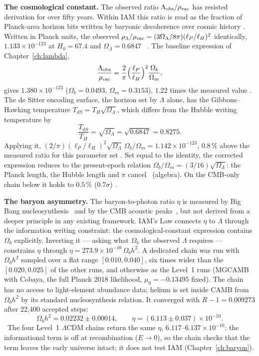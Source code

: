 \textbf{The cosmological constant.} The observed ratio $\Lambda_{\rm obs}/\rho_{\rm vac}$ has resisted derivation for over fifty years. Within IAM this ratio
is read as the fraction of Planck-area horizon bits written by baryonic decoherence over cosmic history \conjecture. Written in Planck units, the observed
$\rho_\Lambda/\rho_{\rm vac}=(3\Omega_\Lambda/8\pi)(\ell_P/\ell_H)^2$ identically, $1.133\times10^{-123}$ at $H_0=67.4$ and $\Omega_\Lambda=0.6847$~\cite{Planck2018VI} \calc. The
baseline expression of Chapter~\ref{ch:lambda},
\begin{equation}
\frac{\Lambda_{\rm obs}}{\rho_{\rm vac}}=\frac2\pi\Big(\frac{\ell_P}{\ell_H}\Big)^2\frac{\Omega_b}{\Omega_m}, \label{eq:law_ccbase}
\end{equation}
gives $1.380\times10^{-123}$ ($\Omega_b=0.0493$, $\Omega_m=0.3153$), $1.22$ times the measured value \calc. The de Sitter encoding surface, the horizon set by
$\Lambda$ alone, has the Gibbons--Hawking temperature $T_{dS}=T_H\sqrt{\Omega_\Lambda}$, which differs from the Hubble writing temperature by
\begin{equation}
\frac{T_{dS}}{T_H}=\sqrt{\Omega_\Lambda}=\sqrt{0.6847}=0.8275 . \label{eq:law_TdS}
\end{equation}
Applying it, $(2/\pi)(\ell_P/\ell_H)^2\sqrt{\Omega_\Lambda}\,\Omega_b/\Omega_m=1.142\times10^{-123}$, $0.8\,\%$ above the measured ratio for this parameter set
\calc. Set equal to the identity, the corrected expression reduces to the present-epoch relation $\Omega_b/\Omega_m=(3/16)\sqrt{\Omega_\Lambda}$: the
Planck length, the Hubble length and $\pi$ cancel \derived\ (algebra). On the CMB-only chain below it holds to $0.5\,\%$ ($0.7\sigma$) \calc.

\textbf{The baryon asymmetry.} The baryon-to-photon ratio $\eta$ is measured by Big Bang nucleosynthesis~\cite{Cyburt2016} and by the CMB acoustic
peaks~\cite{Planck2018VI}, but not derived from a deeper principle in any existing framework. IAM's Law connects $\eta$ to $\Lambda$ through the
information writing constraint: the cosmological-constant expression contains $\Omega_b$ explicitly. Inverting it --- asking what $\Omega_b$ the observed
$\Lambda$ requires --- constrains $\eta$ through $\eta=273.9\times10^{-10}\,\Omega_bh^2$. A dedicated chain was run with $\Omega_bh^2$ sampled over a flat
range $[0.010,0.040]$, six times wider than the $[0.020,0.025]$ of the other runs, and otherwise as the Level~1 runs (MGCAMB with Cobaya, the full Planck 2018
likelihood, $\mu_0=-0.13495$ fixed). The chain has no access to light-element abundance data; helium is set inside CAMB from $\Omega_bh^2$ by its standard
nucleosynthesis relation. It converged with $R-1=0.009273$ after 22,400 accepted steps:
\begin{equation}
\Omega_bh^2=0.02232\pm0.00014,\qquad \eta=(6.113\pm0.037)\times10^{-10}. \label{eq:law_eta_chain}
\end{equation}
\measured\ The four Level~1 $\Lambda$CDM chains return the same $\eta$, $6.117$--$6.137\times10^{-10}$: the informational term is off at recombination ($E\to0$), so the chain
checks that the term leaves the early universe intact; it does not test IAM (Chapter~\ref{ch:baryon}).

